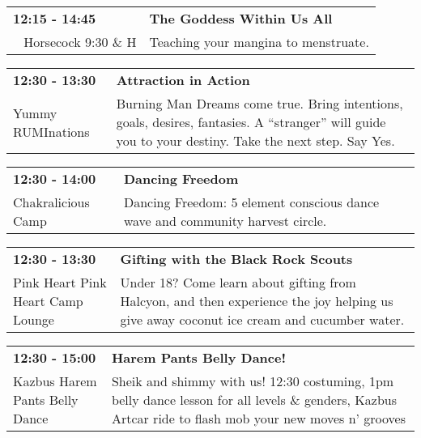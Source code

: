 \begin{tabular}{ p{1in} p{2.2in} }
    \textbf{12:15 - 14:45} & \textbf{The Goddess Within Us All} \\
    ~ \newline Horsecock 9:30 \& H & Teaching your mangina to menstruate. \\
    \hline 
\end{tabular}
    
\begin{tabular}{ p{1in} p{2.2in} }
    \textbf{12:30 - 13:30} & \textbf{Attraction in Action} \\
    Yummy RUMInations \newline  & Burning Man Dreams come true. Bring intentions, goals, desires, fantasies. A ``stranger'' will guide you to your destiny. Take the next step.  Say Yes. \\
    \hline 
\end{tabular}
    
\begin{tabular}{ p{1in} p{2.2in} }
    \textbf{12:30 - 14:00} & \textbf{Dancing Freedom} \\
    Chakralicious Camp \newline  & Dancing Freedom: 5 element conscious dance wave and community harvest circle. \\
    \hline 
\end{tabular}
    
\begin{tabular}{ p{1in} p{2.2in} }
    \textbf{12:30 - 13:30} & \textbf{Gifting with the Black Rock Scouts} \\
    Pink Heart \newline Pink Heart Camp Lounge & Under 18? Come learn about gifting from Halcyon, and then experience the joy helping us give away coconut ice cream and cucumber water. \\
    \hline 
\end{tabular}
    
\begin{tabular}{ p{1in} p{2.2in} }
    \textbf{12:30 - 15:00} & \textbf{Harem Pants Belly Dance!} \\
    Kazbus Harem Pants Belly Dance \newline  & Sheik and shimmy with us! 12:30 costuming, 1pm belly dance lesson for all levels \& genders, Kazbus Artcar ride to flash mob your new moves n' grooves \\
    \hline 
\end{tabular}
    
